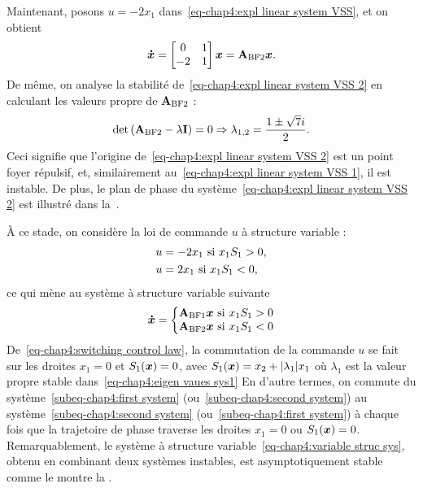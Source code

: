 Maintenant, posons $u = -2x_1$ dans~\eqref{eq-chap4:expl linear system VSS}, et on obtient
\begin{equation}\label{eq-chap4:expl linear system VSS 2}
	\bm{\dot{x}} = \begin{bmatrix}
		0&1\\-2&1
	\end{bmatrix}\bm{x} = \mathbf{A}_{\rm BF 2}\bm{x}.
\end{equation}
De même, on analyse la stabilité de~\eqref{eq-chap4:expl linear system VSS 2} en calculant les valeurs propre de $\mathbf{A}_{\rm BF 2}$ : 
\begin{equation}
	\det\left(\mathbf{A}_{\rm BF 2}-\lambda\mathbf{I}\right) = 0 \Rightarrow \lambda_{1,2} = \frac{1 \pm \sqrt{7}i}{2}.
\end{equation}
Ceci signifie que l'origine de~\eqref{eq-chap4:expl linear system VSS 2} est un point foyer répulsif, et, similairement au~\eqref{eq-chap4:expl linear system VSS 1}, il est instable. De plus, le plan de phase du système~\eqref{eq-chap4:expl linear system VSS 2} est illustré dans la~.

À ce stade, on considère la loi de commande $u$   à structure variable :
\begin{subequations}\label{eq-chap4:switching control law}
\begin{align}
	\label{subeq-chap4:first system}u &= -2x_1~{\rm{si}}~ x_1S_1>0  , \\\label{subeq-chap4:second system}
	u &= 2x_1~{\rm{si}}~ x_1S_1<0 ,
\end{align}
\end{subequations}
ce qui mène au système à structure variable suivante 
\begin{equation}\label{eq-chap4:variable struc sys}
	\bm{\dot{x}} = \left\{\begin{matrix}
	\mathbf{A}_{\rm BF 1}\bm{x} ~{\rm{si}}~ x_1S_1>0\\\mathbf{A}_{\rm BF 2}\bm{x}~{\rm{si}}~ x_1S_1<0 
	\end{matrix}\right.
\end{equation}
De~\eqref{eq-chap4:switching control law}, la commutation de la commande $u$ se fait sur  les droites $x_1=0$ et $S_1(\bm{x})=0$, avec $S_1(\bm{x}) = x_2 + |\lambda_1|x_1$ où $\lambda_1$ est la valeur propre stable dans~\eqref{eq-chap4:eigen vaues sys1} En d'autre termes, on commute du système~\eqref{subeq-chap4:first system} (ou~\eqref{subeq-chap4:second system}) au système~\eqref{subeq-chap4:second system} (ou~\eqref{subeq-chap4:first system}) à chaque fois que la trajetoire de phase traverse les droites $x_1=0$ ou $S_1(\bm{x})=0$. Remarquablement, le système à structure variable~\eqref{eq-chap4:variable struc sys}, obtenu en combinant deux systèmes instables, est asymptotiquement stable comme le montre la . 

